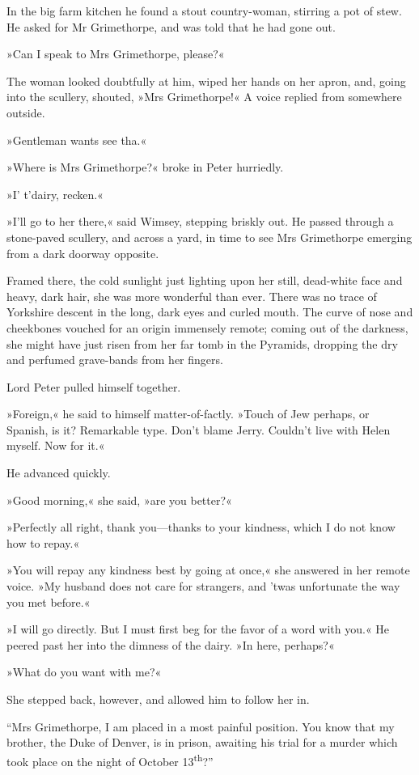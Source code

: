 In the big farm kitchen he found a stout country-woman, stirring a pot of stew. He asked for Mr Grimethorpe, and was told that he had gone out.

»Can I speak to Mrs Grimethorpe, please?«

The woman looked doubtfully at him, wiped her hands on her apron, and, going into the scullery, shouted, »Mrs Grimethorpe!« A voice replied from somewhere outside.

»Gentleman wants see tha.«

»Where is Mrs Grimethorpe?« broke in Peter hurriedly.

»I' t'dairy, recken.«

»I'll go to her there,« said Wimsey, stepping briskly out. He passed through a stone-paved scullery, and across a yard, in time to see Mrs  Grimethorpe emerging from a dark doorway opposite.

Framed there, the cold sunlight just lighting upon her still, dead-white face and heavy, dark hair, she was more wonderful than ever.  There was no trace of Yorkshire descent in the long, dark eyes and curled mouth. The curve of nose and cheekbones vouched for an origin immensely remote; coming out of the darkness, she might have just risen from her far tomb in the Pyramids, dropping the dry and perfumed grave-bands from her fingers.

Lord Peter pulled himself together.

»Foreign,« he said to himself matter-of-factly. »Touch of Jew perhaps, or Spanish, is it? Remarkable type. Don't blame Jerry. Couldn't live with Helen myself. Now for it.«

He advanced quickly.

»Good morning,« she said, »are you better?«

»Perfectly all right, thank you\allowbreak---\allowbreak thanks to your kindness, which I do not know how to repay.«

»You will repay any kindness best by going at once,« she answered in her remote voice. »My husband does not care for strangers, and 'twas unfortunate the way you met before.«

»I will go directly. But I must first beg for the favor of a word with you.« He peered past her into the dimness of the dairy. »In here, perhaps?«

»What do you want with me?«

She stepped back, however, and allowed him to follow her in.

\enquote{Mrs Grimethorpe, I am placed in a most painful position. You know that my brother, the Duke of Denver, is in prison, awaiting his trial for a murder which took place on the night of October 13\textsuperscript{th}?}

